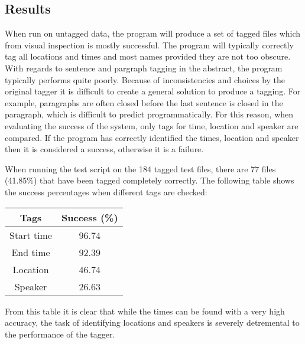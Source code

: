 \documentclass[draft]{article}
\begin{document}
\begin{multicols*}{2}
\section*{Results}
When run on untagged data, the program will produce a set of tagged files which from visual inspection is mostly successful. The program will typically correctly tag all locations and times and most names provided they are not too obscure. With regards to sentence and pargraph tagging in the abstract, the program typically performs quite poorly. Because of inconsistencies and choices by the original tagger it is difficult to create a general solution to produce a tagging. For example, paragraphs are often closed before the last sentence is closed in the paragraph, which is difficult to predict programmatically. For this reason, when evaluating the success of the system, only tags for time, location and speaker are compared. If the program has correctly identified the times, location and speaker then it is considered a success, otherwise it is a failure.

When running the test script on the 184 tagged test files, there are 77 files (41.85\%) that have been tagged completely correctly. The following table shows the success percentages when different tags are checked:
\begin{center}
\begin{tabular}{| c || c |}
\hline
Tags & Success (\%) \\
\hline
Start time & 96.74 \\
End time   & 92.39 \\
Location   & 46.74 \\
Speaker    & 26.63 \\
\hline
\end{tabular}
\end{center}  

From this table it is clear that while the times can be found with a very high accuracy, the task of identifying locations and speakers is severely detremental to the performance of the tagger.




\end{multicols*}
\end{document}

